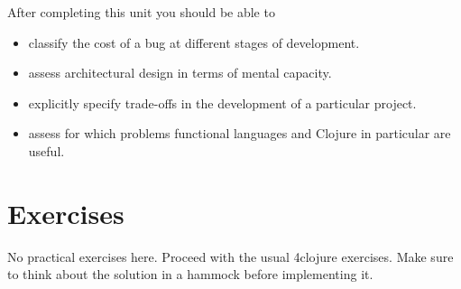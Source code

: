 \documentclass[11pt,a4paper]{article}
\begin{document}
After completing this unit you should be able to

\begin{itemize}
    \item classify the cost of a bug at different stages of development.
    \item assess architectural design in terms of mental capacity.
    \item explicitly specify trade-offs in the development of a particular project.
    \item assess for which problems functional languages and Clojure in particular are useful.
\end{itemize}



\section{Exercises}

No practical exercises here.
Proceed with the usual 4clojure exercises.
Make sure to think about the solution in a hammock before implementing it.
\end{document}

